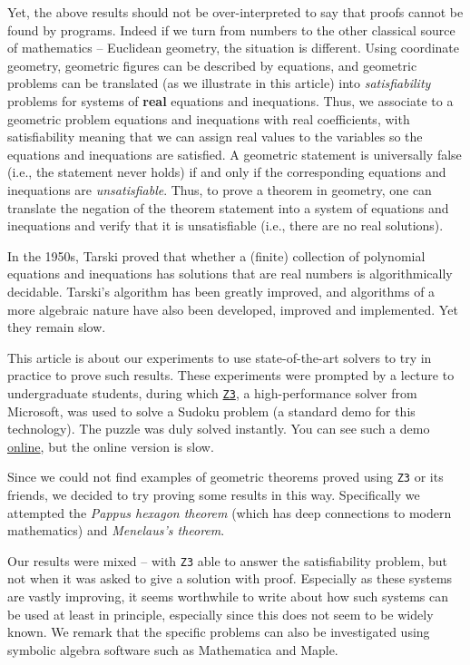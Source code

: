 \documentclass{amsart}
\theoremstyle{plain}
\theoremstyle{definition}
\theoremstyle{remark}
\begin{document}
Yet, the above results should not be over-interpreted to say that proofs
cannot be found by programs. Indeed if we turn from numbers to the other
classical source of mathematics -- Euclidean geometry, the situation is
different. Using coordinate geometry, geometric figures can be described by equations,
and geometric problems can be translated (as we illustrate in this article) into
\emph{satisfiability} problems for systems of \textbf{real} equations and inequations. Thus, we
associate to a geometric problem equations and inequations with real coefficients,
with satisfiability meaning that we can
assign real values to the variables so the equations and inequations are satisfied.
A geometric statement is universally false (i.e., the statement never holds) if and only if the corresponding equations and inequations are \emph{unsatisfiable}. Thus, to prove a theorem in geometry, one can translate the negation of the theorem statement into a system of equations and inequations and verify that it is unsatisfiable (i.e., there are no real solutions).

In the 1950s, Tarski proved that whether a (finite)
collection of polynomial equations and inequations has solutions that
are real numbers is algorithmically decidable.  Tarski's algorithm has been greatly improved,
and algorithms of a more algebraic nature have also been developed,
improved and implemented. Yet they remain slow.

This article is about our experiments to use
state-of-the-art solvers to try in practice to prove such results.
These experiments were prompted by a lecture
to undergraduate students, during which \href{https://github.com/Z3Prover/z3}{\texttt{Z3}}, a high-performance
solver from Microsoft, was used to solve a Sudoku problem (a standard demo for this technology). The puzzle was duly solved instantly. You can see such
a demo \href{https://rise4fun.com/Z3/Cs7p}{online}, but the online
version is slow.

Since we could not find examples of geometric theorems proved using \texttt{Z3} or
its friends, we decided to try proving
some results in this way. Specifically we attempted the \emph{Pappus hexagon theorem}
(which has deep connections to modern mathematics) and \emph{Menelaus's theorem}.

Our results were mixed -- with \texttt{Z3} able to answer the satisfiability problem,
but not when it was asked to give a solution with proof.
Especially as these systems are vastly improving, it seems worthwhile to
write about how such systems can be used at least in principle,
especially since this does not seem to be widely known. We remark that the 
specific problems can also be investigated using symbolic algebra software such as Mathematica and Maple.
\end{document}
